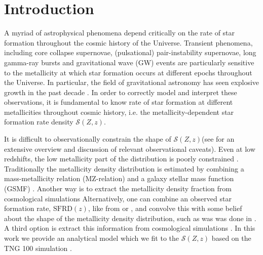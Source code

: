 \documentclass[twocolumn]{aastex631}
\newcommand{\SFRDzZ}{\ensuremath{\mathcal{S}(Z,z)}\xspace}
\newcommand{\SFRDz}{\ensuremath{\mathrm{SFRD}(z)}\xspace}
\begin{document}


\section{Introduction \label{sec: intro}}
A myriad of astrophysical phenomena depend critically on the rate of star formation throughout the cosmic history of the Universe. Transient phenomena, including core collapse supernovae, (pulsational) pair-instability supernovae, long gamma-ray bursts and gravitational wave (GW) events are particularly sensitive to the metallicity at which star formation occurs at different epochs throughout the Universe.
In particular, the field of gravitational astronomy has seen explosive growth in the past decade \citep[][]{GWTC1,GWTC2,GWTC3}. In order to correctly model and interpret these observations, it is fundamental to know rate of star formation at different metallicities throughout cosmic history, i.e. the metallicity-dependent star formation rate density \SFRDzZ \citep[see also the recent review by][]{chruslinska2022_review}.

It is difficult to observationally constrain the shape of \SFRDzZ (see \cite{Chruslinska2019_obs} for an extensive overview and discussion of relevant observational caveats). Even at low redshifts, the low metallicity part of the distribution is poorly constrained \citep{Chruslinska+2021}.
Traditionally the metallicity density distribution is estimated by combining a mass-metallicity relation (MZ-relation) and a galaxy stellar mass function (GSMF) \citep[see also][]{Chruslinska+2018, Chruslinska2019_effectCO, Broekgaarden+2021a}.
Another way is to extract the metallicity density fraction from cosmological simulations \citep[e.g.]{Mapelli2017, Schneider+2017}
Alternatively, one can combine an observed star formation rate, \SFRDz, like from \cite{MadauDickinson2014} or \cite{Madau+2017}, and convolve this with some belief about the shape of the metallicity density distribution, such as was was done in \cite{Neijssel+2019}.
A third option is extract this information from cosmological simulations \citep[e.g.][]{Mapelli+2017,Schneider+2017}.
In this work we provide an analytical model which we fit to the \SFRDzZ based on the TNG 100 simulation \citep{Pillepich2018, Weinberger2017}.
\end{document}
